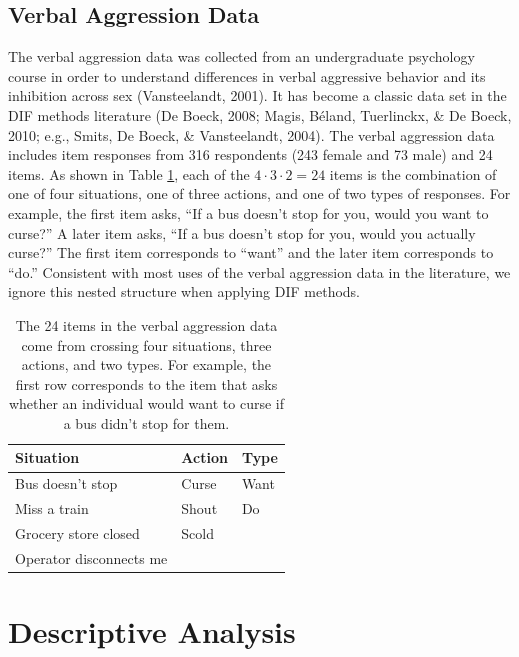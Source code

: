 \documentclass[
  english,
  man,floatsintext]{apa6}
\begin{document}
\hypertarget{verbal-aggression-data}{%
\subsection{Verbal Aggression Data}\label{verbal-aggression-data}}

The verbal aggression data was collected from an undergraduate psychology course in order to understand differences in verbal aggressive behavior and its inhibition across sex (Vansteelandt, 2001). It has become a classic data set in the DIF methods literature (De Boeck, 2008; Magis, Béland, Tuerlinckx, \& De Boeck, 2010; e.g., Smits, De Boeck, \& Vansteelandt, 2004). The verbal aggression data includes item responses from 316 respondents (243 female and 73 male) and 24 items. As shown in Table \ref{table:verbal}, each of the \(4 \cdot 3 \cdot 2 = 24\) items is the combination of one of four situations, one of three actions, and one of two types of responses. For example, the first item asks, ``If a bus doesn't stop for you, would you want to curse?'' A later item asks, ``If a bus doesn't stop for you, would you actually curse?'' The first item corresponds to ``want'' and the later item corresponds to ``do.'' Consistent with most uses of the verbal aggression data in the literature, we ignore this nested structure when applying DIF methods.

\begin{table}[H]
\caption{The 24 items in the verbal aggression data come from crossing four situations, three actions, and two types. For example, the first row corresponds to the item that asks whether an individual would want to curse if a bus didn’t stop for them.}
\centering
\begin{tabular}{|p{5cm}|p{3cm}|p{3cm}|}
\toprule
 Situation & Action & Type \\\midrule
 Bus doesn't stop & Curse & Want \\\hline
 Miss a train & Shout & Do  \\\hline
 Grocery store closed & Scold & \\\hline
 Operator disconnects me &  & \\ 
\bottomrule
\end{tabular}
\label{table:verbal}
\end{table}

\hypertarget{descriptive}{%
\section{Descriptive Analysis}\label{descriptive}}
\end{document}
